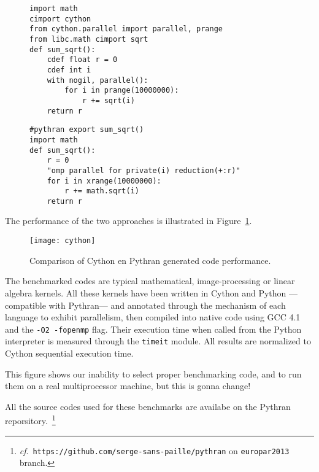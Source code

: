 \documentclass{llncs}
\begin{document}
\begin{figure}[ht]

    \begin{lstlisting}[label={lst:cython-sample}, caption={Cython Impelmentation
    of a Parallel Reduction.}]
import math
cimport cython
from cython.parallel import parallel, prange
from libc.math cimport sqrt
def sum_sqrt():
    cdef float r = 0
    cdef int i
    with nogil, parallel():
        for i in prange(10000000):
            r += sqrt(i)
    return r
\end{lstlisting}
\end{figure}
%
\begin{figure}[ht]
    \begin{lstlisting}[label={lst:pythran-sample}, caption={Cython Impelmentation
    of a Parallel Reduction.}]
#pythran export sum_sqrt()
import math
def sum_sqrt():
    r = 0
    "omp parallel for private(i) reduction(+:r)"
    for i in xrange(10000000):
        r += math.sqrt(i)
    return r
    \end{lstlisting}
\end{figure}



The performance of the two approaches is illustrated in
Figure~\ref{fig:cython-pythran}.

\begin{figure}[ht]
    \texttt{[image: cython]}
    \caption{Comparison of Cython en Pythran generated code performance.}
    \label{fig:cython-pythran}
\end{figure}

The benchmarked codes are typical mathematical, image-processing or linear
algebra kernels. All these kernels have been written in Cython and Python
---compatible with Pythran--- and annotated through the mechanism of each
language to exhibit parallelism, then compiled into native code using GCC 4.1
and the \texttt{-O2 -fopenmp} flag. Their execution time when called from the
Python interpreter is measured through the \texttt{timeit} module. All results
are normalized to Cython sequential execution time.

This figure shows our inability to select proper benchmarking code, and to run
them on a real multiprocessor machine, but this is gonna change!~

All the source codes used for these benchmarks are availabe on the Pythran
reporsitory.~\footnote{\emph{cf}.\
\texttt{https://github.com/serge-sans-paille/pythran} on \texttt{europar2013}
branch.} 
\end{document}
